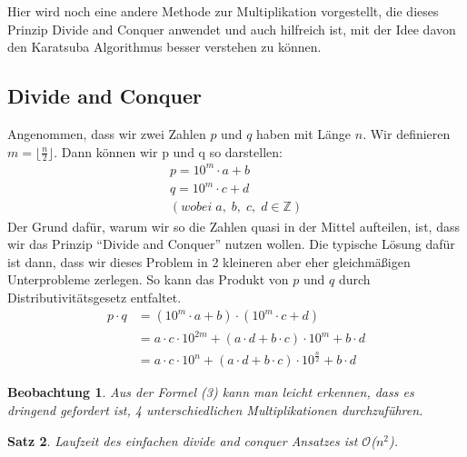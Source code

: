 \documentclass[11pt,a4paper, twoside]{article}
\newtheorem{theorem}{Satz}
\newtheorem{observation}[theorem]{Beobachtung}
\theoremstyle{definition}
\begin{document}
Hier wird noch eine andere Methode zur Multiplikation vorgestellt, die dieses Prinzip Divide and Conquer anwendet und auch hilfreich ist, mit der Idee davon den Karatsuba Algorithmus besser verstehen zu können. \\

\subsection{Divide and Conquer}
Angenommen, dass wir zwei Zahlen $p$ und $q$ haben mit Länge $n$. Wir definieren $m = \lfloor \frac{n}{2} \rfloor$. Dann können wir p und q so darstellen: 
\begin{align*}
p = 10^{m} \cdot a + b\\
q = 10^{m} \cdot c + d\\
(wobei \;a, \;b, \;c, \;d \in \mathbb{Z})
\end{align*}
Der Grund dafür, warum wir so die Zahlen quasi in der Mittel aufteilen, ist, dass wir das Prinzip “Divide and Conquer” nutzen wollen. Die typische Lösung dafür ist dann, dass wir dieses Problem in 2 kleineren aber eher gleichmäßigen Unterprobleme zerlegen.
So kann das Produkt von \(p\) und \(q\) durch Distributivitätsgesetz entfaltet.
\begin{align}
p \cdot q &= (10^{m} \cdot a + b) \cdot (10^{m} \cdot c + d)\\
&= a \cdot c \cdot 10^{2m} + (a \cdot d + b \cdot c) \cdot 10^{m} + b \cdot d\\
&= a \cdot c \cdot 10^{n} + (a \cdot d + b \cdot c) \cdot 10^{\frac{n}{2}} + b \cdot d
\end{align}

\begin{observation}
Aus der Formel (3) kann man leicht erkennen, dass es dringend gefordert ist, 4 unterschiedlichen Multiplikationen durchzuführen.
\end{observation}

\begin{theorem}
Laufzeit des einfachen divide and conquer Ansatzes ist $\mathcal{O}$($n^{2}$).
\end{theorem}
\end{document}
